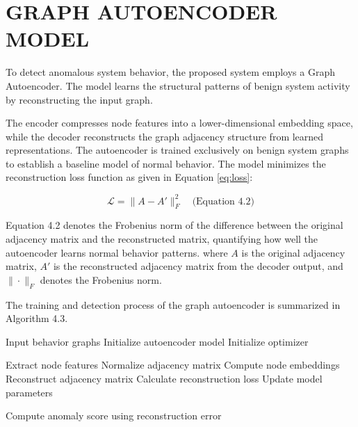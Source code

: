 \section{\uppercase{GRAPH AUTOENCODER MODEL}}

To detect anomalous system behavior, the proposed system employs a Graph Autoencoder. The model learns the structural patterns of benign system activity by reconstructing the input graph.

The encoder compresses node features into a lower-dimensional embedding space, while the decoder reconstructs the graph adjacency structure from learned representations. The autoencoder is trained exclusively on benign system graphs to establish a baseline model of normal behavior. The model minimizes the reconstruction loss function as given in Equation \ref{eq:loss}:

\begin{equation}
\mathcal{L} = \|A - A'\|_F^2 \quad \text{(Equation 4.2)}
\label{eq:loss}
\end{equation}

Equation 4.2 denotes the Frobenius norm of the difference between the original adjacency matrix and the reconstructed matrix, quantifying how well the autoencoder learns normal behavior patterns. where $A$ is the original adjacency matrix, $A'$ is the reconstructed adjacency matrix from the decoder output, and $\|\cdot\|_F$ denotes the Frobenius norm.

The training and detection process of the graph autoencoder is summarized in Algorithm 4.3.

\begin{algorithm}[H]
\caption{Graph Autoencoder Training and Detection}
\begin{algorithmic}[1]

\State Input behavior graphs
\State Initialize autoencoder model
\State Initialize optimizer



\State Extract node features
\State Normalize adjacency matrix
\State Compute node embeddings
\State Reconstruct adjacency matrix
\State Calculate reconstruction loss
\State Update model parameters

\EndFor

\EndFor

\State Compute anomaly score using reconstruction error

\end{algorithmic}
\end{algorithm}

